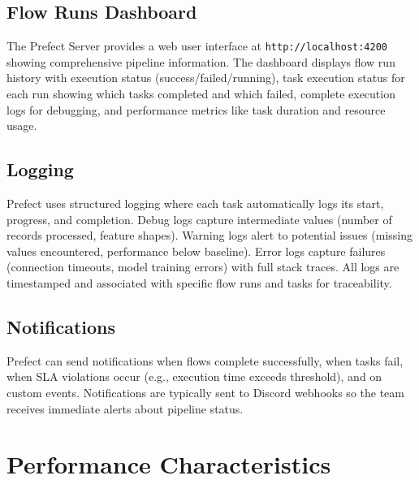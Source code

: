 \subsection{Flow Runs Dashboard}

The Prefect Server provides a web user interface at \texttt{http://localhost:4200} showing comprehensive pipeline information. The dashboard displays flow run history with execution status (success/failed/running), task execution status for each run showing which tasks completed and which failed, complete execution logs for debugging, and performance metrics like task duration and resource usage.

\subsection{Logging}

Prefect uses structured logging where each task automatically logs its start, progress, and completion. Debug logs capture intermediate values (number of records processed, feature shapes). Warning logs alert to potential issues (missing values encountered, performance below baseline). Error logs capture failures (connection timeouts, model training errors) with full stack traces. All logs are timestamped and associated with specific flow runs and tasks for traceability.

\subsection{Notifications}

Prefect can send notifications when flows complete successfully, when tasks fail, when SLA violations occur (e.g., execution time exceeds threshold), and on custom events. Notifications are typically sent to Discord webhooks so the team receives immediate alerts about pipeline status.

\section{Performance Characteristics}

